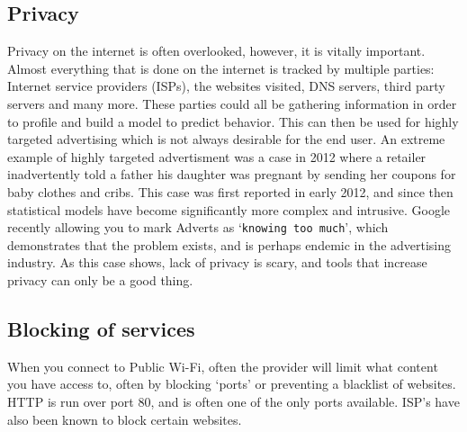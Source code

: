 \subsection{Privacy}
Privacy on the internet is often overlooked, however, it is vitally important\cite{privacyrulez}. Almost everything that is done on the internet is tracked by multiple parties: Internet service providers (ISPs), the websites visited, DNS servers, third party servers and many more. These parties could all be gathering information in order to profile and build a model to predict behavior. This can then be used for highly targeted advertising which is not always desirable for the end user. An extreme example of highly targeted advertisment was a case in 2012 where a retailer inadvertently told a father his daughter was pregnant by sending her coupons for baby clothes and cribs.\cite{babyshower}
This case was first reported in early 2012, and since then statistical models have become significantly more complex and intrusive. Google recently allowing you to mark Adverts as `\texttt{knowing too much}'\cite{googlearewatching}, which demonstrates that the problem exists, and is perhaps endemic in the advertising industry.
As this case shows, lack of privacy is scary, and tools that increase privacy can only be a good thing. 

\subsection{Blocking of services}
When you connect to Public Wi-Fi, often the provider will limit what content you have access to, often by blocking `ports' or preventing a blacklist of websites.\\
HTTP is run over port 80, and is often one of the only ports available. ISP's have also been known to block certain websites.


